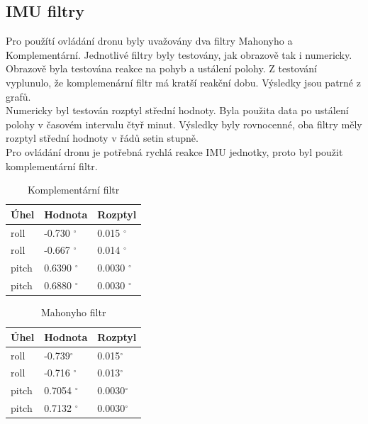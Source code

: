 \subsection{IMU filtry}
Pro použítí ovládání dronu byly uvažovány dva filtry Mahonyho a Komplementární. Jednotlivé filtry byly testovány, jak obrazově tak i numericky.\\
Obrazově byla testována reakce na pohyb a ustálení polohy.
Z testování vyplunulo, že komplemenární filtr má kratší reakční dobu. Výsledky jsou patrné z grafů.\\
Numericky byl testován rozptyl střední hodnoty. Byla použita data po ustálení polohy v časovém intervalu čtyř minut. Výsledky byly rovnocenné, oba filtry měly rozptyl střední hodnoty v řádů setin stupně.\\
Pro ovládání dronu je potřebná rychlá reakce IMU jednotky, proto byl použit komplementární filtr.\\

\begin{table}[]
		\centering
	
	\begin{tabular}{|l|l|l|}
		\hline
		\textbf{Úhel} & \textbf{Hodnota} & \textbf{Rozptyl} \\ \hline
		roll          & -0.730 $^\circ$  & 0.015 $^\circ$   \\ \hline
		roll          & -0.667 $^\circ$  & 0.014 $^\circ$   \\ \hline
		pitch         & 0.6390 $^\circ$  & 0.0030 $^\circ$  \\ \hline
		pitch         & 0.6880 $^\circ$  & 0.0030 $^\circ$  \\ \hline
	\end{tabular}
\caption{Komplementární filtr}
\end{table}

\begin{table}[]
			\centering
	\begin{tabular}{|l|l|l|}
		\hline
		\textbf{Úhel} & \textbf{Hodnota} & \textbf{Rozptyl} \\ \hline
		roll          & -0.739$^\circ$   & 0.015$^\circ$    \\ \hline
		roll          & -0.716 $^\circ$  & 0.013$^\circ$    \\ \hline
		pitch         & 0.7054 $^\circ$  & 0.0030$^\circ$   \\ \hline
		pitch         & 0.7132 $^\circ$  & 0.0030$^\circ$   \\ \hline
	\end{tabular}
\caption{Mahonyho filtr}
\end{table}

